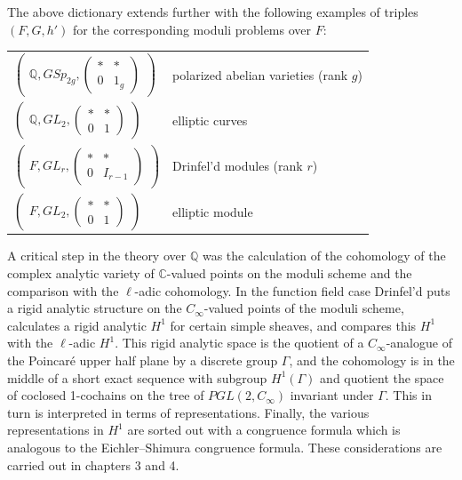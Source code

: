 \documentclass[12pt,a4paper]{article}
\theoremstyle{plain}
\theoremstyle{definition}
\theoremstyle{remark}
\newcommand{\bQ}{\mathbb{Q}}
\newcommand{\bC}{\mathbb{C}}
\begin{document}
The above dictionary extends further with the following examples of triples $(F, G, h')$ for the corresponding moduli problems over $F$:

\begin{center}
\begin{tabular}{ll}
$\begin{pmatrix} \bQ, GSp_{2g}, \begin{pmatrix} * & * \\ 0 & 1_g \end{pmatrix} \end{pmatrix}$ & polarized abelian varieties (rank $g$) \\
$\begin{pmatrix} \bQ, GL_2, \begin{pmatrix} * & * \\ 0 & 1 \end{pmatrix} \end{pmatrix}$ & elliptic curves \\
$\begin{pmatrix} F, GL_r, \begin{pmatrix} * & * \\ 0 & I_{r-1} \end{pmatrix} \end{pmatrix}$ & Drinfel'd modules (rank $r$) \\
$\begin{pmatrix} F, GL_2, \begin{pmatrix} * & * \\ 0 & 1 \end{pmatrix} \end{pmatrix}$ & elliptic module
\end{tabular}
\end{center}

A critical step in the theory over $\bQ$ was the calculation of the cohomology of the complex analytic variety of $\bC$-valued points on the moduli scheme and the comparison with the $\ell$-adic cohomology. In the function field case Drinfel'd puts a rigid analytic structure on the $C_\infty$-valued points of the moduli scheme, calculates a rigid analytic $H^1$ for certain simple sheaves, and compares this $H^1$ with the $\ell$-adic $H^1$. This rigid analytic space is the quotient of a $C_\infty$-analogue of the Poincar\'e upper half plane by a discrete group $\Gamma$, and the cohomology is in the middle of a short exact sequence with subgroup $H^1(\Gamma)$ and quotient the space of coclosed 1-cochains on the tree of $PGL(2, C_\infty)$ invariant under $\Gamma$. This in turn is interpreted in terms of representations. Finally, the various representations in $H^1$ are sorted out with a congruence formula which is analogous to the Eichler--Shimura congruence formula. These considerations are carried out in chapters 3 and 4.
\end{document}
